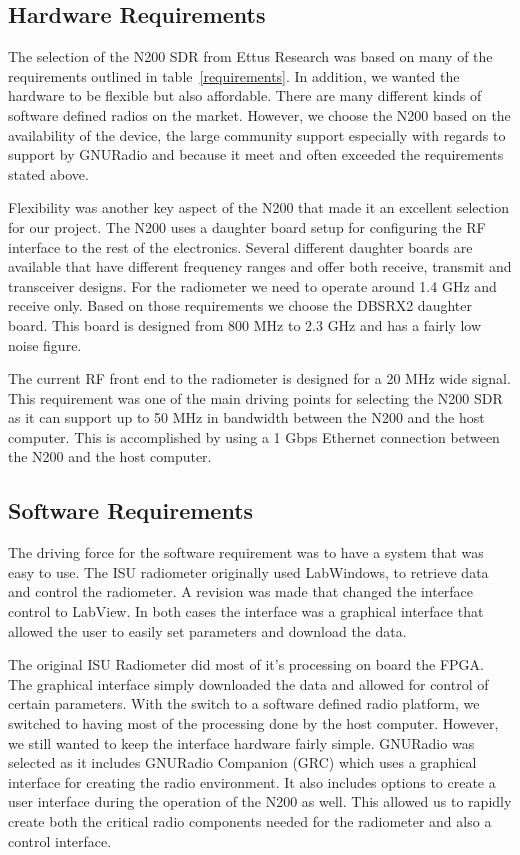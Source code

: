 \subsection{Hardware Requirements}

The selection of the N200 SDR from Ettus Research was based on many of the requirements outlined in table~\ref{requirements}.  In addition, we wanted the hardware to be flexible but also affordable.  There are many different kinds of software defined radios on the market.  However, we choose the N200 based on the availability of the device, the large community support especially with regards to support by GNURadio and because it meet and often exceeded the requirements stated above.  

Flexibility was another key aspect of the N200 that made it an excellent selection for our project.  The N200 uses a daughter board setup for configuring the RF interface to the rest of the electronics.  Several different daughter boards are available that have different frequency ranges and offer both receive, transmit and transceiver designs.  For the radiometer we need to operate around 1.4 GHz and receive only.  Based on those requirements we choose the DBSRX2 daughter board.  This board is designed from 800 MHz to 2.3 GHz and has a fairly low noise figure.   


The current RF front end to the radiometer is designed for a 20 MHz wide signal.  This requirement was one of the main driving points for selecting the N200 SDR as it can support up to 50 MHz in bandwidth between the N200 and the host computer.  This is accomplished by using a 1 Gbps Ethernet connection between the N200 and the host computer.


\subsection{Software Requirements}

The driving force for the software requirement was to have a system that was easy to use.  The ISU radiometer originally used LabWindows, to retrieve data and control the radiometer.  A revision was made that changed the interface control to LabView.  In both cases the interface was a graphical interface that allowed the user to easily set parameters and download the data.

The original ISU Radiometer did most of it's processing on board the FPGA.  The graphical interface simply downloaded the data and allowed for control of certain parameters.  With the switch to a software defined radio platform, we switched to having most of the processing done by the host computer.  However, we still wanted to keep the interface hardware fairly simple.  GNURadio was selected as it includes GNURadio Companion (GRC) which uses a graphical interface for creating the radio environment.  It also includes options to create a user interface during the operation of the N200 as well.  This allowed us to rapidly create both the critical radio components needed for the radiometer and also a control interface.


